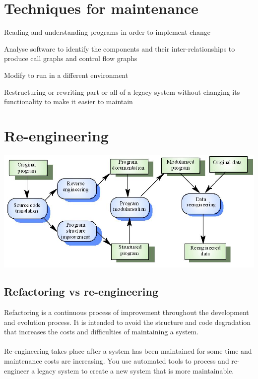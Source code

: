 \documentclass{article}[18pt]
\begin{document}
\section{Techniques for maintenance}
\begin{definition}
	Reading and understanding programs in order to implement change
\end{definition}
\begin{definition}
Analyse software to identify the components and their inter-relationships to produce call graphs and control flow graphs
\end{definition}
\begin{definition}[Migration]
Modify to run in a different environment
\end{definition}
\begin{definition}[Re-engineering]
Restructuring or rewriting part or all of a legacy system without changing its functionality to make it easier to maintain
\end{definition}
\section{Re-engineering}
\begin{center}
	\includegraphics[scale=0.7]{re-engineering}
\end{center}
\subsection{Refactoring vs re-engineering}
Refactoring is a continuous process of improvement throughout the development and evolution process. It is intended to avoid the structure and code degradation that increases the costs and difficulties of maintaining a system.\\
\\
Re-engineering takes place after a system has been maintained for some time and maintenance costs are increasing. You use automated tools to process and re-engineer a legacy system to create a new system that is more maintainable. 
\end{document}
